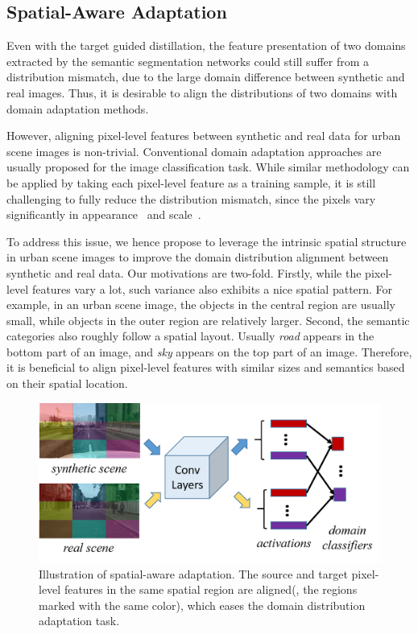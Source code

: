 \documentclass[10pt,twocolumn,letterpaper]{article}
\begin{document}
\subsection{Spatial-Aware Adaptation}
Even with the target guided distillation, the feature presentation of two domains extracted by the semantic segmentation networks could still suffer from a distribution mismatch, due to the large domain difference between synthetic and real images. Thus, it is desirable to align the distributions of two domains with domain adaptation methods. 

However, aligning pixel-level features between synthetic and real data for urban scene images is non-trivial. Conventional domain adaptation approaches are usually proposed for the image classification task. While similar methodology can be applied by taking each pixel-level feature as a training sample, it is still challenging to fully reduce the distribution mismatch, since the pixels vary significantly in appearance~\cite{hoffman2016fcns} and scale~\cite{chen2016scale}.

To address this issue, we hence propose to leverage the intrinsic spatial structure in urban scene images to improve the domain distribution alignment between synthetic and real data. Our motivations are two-fold. Firstly, while the pixel-level features vary a lot, such variance also exhibits a nice spatial pattern. For example, in an urban scene image, the objects in the central region are usually small, while objects in the outer region are relatively larger. Second, the semantic categories also roughly follow a spatial layout. Usually \textit{road} appears in the bottom part of an image, and \textit{sky} appears on the top part of an image. Therefore, it is beneficial to align pixel-level features with similar sizes and semantics based on their spatial location.  

\begin{figure}
\centering
\includegraphics[width=1.0\linewidth]{fig_rdo.png}
\caption{Illustration of spatial-aware adaptation. The source and target pixel-level features in the same spatial region are aligned(\ie, the regions marked with the same color), which eases the domain distribution adaptation task. }
\label{fig:fig_rdo}
\vspace{-4mm}
\end{figure}
\end{document}
